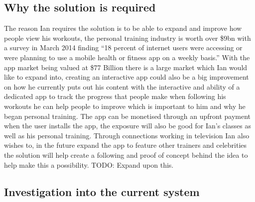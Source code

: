 \documentclass[a4paper]{article}
\begin{document}
	\subsection{Why the solution is required}
	The reason Ian requires the solution is to be able to expand and improve how people view his workouts, the personal training industry is worth over \$9bn with a survey in March 2014 finding “18 percent of internet users were accessing or were planning to use a mobile health or fitness app on a weekly basis.” With the app market being valued at \$77 Billion there is a large market which Ian would like to expand into, creating an interactive app could also be a big improvement on how he currently puts out his content with the interactive and ability of a dedicated app to track the progress that people make when following his workouts he can help people to improve which is important to him and why he began personal training. The app can be monetised through an upfront payment when the user installs the app, the exposure will also be good for Ian’s classes as well as his personal training. Through connections working in television Ian also wishes to, in the future expand the app to feature other trainers and celebrities the solution will help create a following and proof of concept behind the idea to help make this a possibility. TODO: Expand upon this.

 	\subsection{Investigation into the current system}

\end{document}
